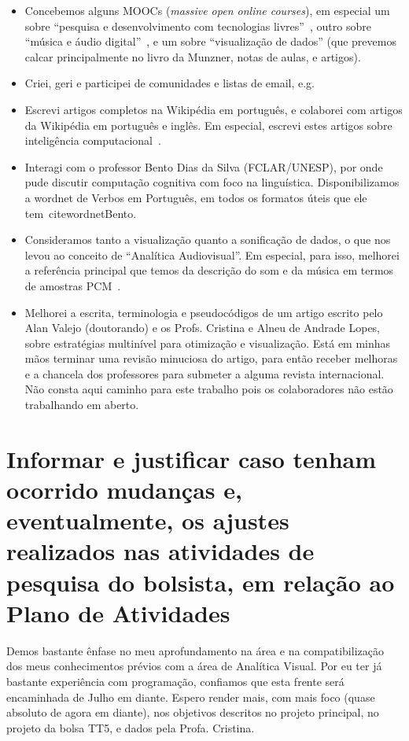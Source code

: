 \documentclass[a4paper, 11pt]{article}
\begin{document}
\begin{itemize}
  \item Concebemos alguns MOOCs (\emph{massive open online courses}), em especial um sobre ``pesquisa e desenvolvimento com tecnologias livres''~\cite{tecl}, outro sobre ``música e áudio digital''~\cite{mus}, e um sobre ``visualização de dados'' (que prevemos calcar principalmente no livro da Munzner, notas de aulas, e artigos).
  \item Criei, geri e participei de comunidades e listas de email, e.g.~\cite{vimUse,fvim,fpln,fic,frc}
  \item Escrevi artigos completos na Wikipédia em português, e colaborei com artigos da Wikipédia em português e inglês. Em especial, escrevi estes artigos sobre inteligência computacional~\cite{wic,wsd,wib,wpe,wpo,wed,wsi,wcc,wce}.
  \item Interagi com o professor Bento Dias da Silva (FCLAR/UNESP), por onde pude discutir computação cognitiva com foco na linguística. Disponibilizamos a wordnet de Verbos em Português, em todos os formatos úteis que ele tem~cite{wordnetBento}.
  \item Consideramos tanto a visualização quanto a sonificação de dados, o que nos levou ao conceito de ``Analítica Audiovisual''. Em especial, para isso, melhorei a referência principal que temos da descrição do som e da música em termos de amostras PCM~\cite{arxiv}.
  \item Melhorei a escrita, terminologia e pseudocódigos de um artigo escrito pelo Alan Valejo (doutorando) e os Profs. Cristina e Alneu de Andrade Lopes, sobre estratégias multinível para otimização e visualização. Está em minhas mãos terminar uma revisão minuciosa do artigo, para então receber melhoras e a chancela dos professores para submeter a alguma revista internacional. Não consta aqui caminho para este trabalho pois os colaboradores não estão trabalhando em aberto.
\end{itemize}

\section{Informar e justificar caso tenham ocorrido mudanças e, eventualmente, os ajustes realizados nas atividades de pesquisa do bolsista, em relação ao Plano de Atividades}
Demos bastante ênfase no meu aprofundamento na área e na compatibilização dos meus conhecimentos prévios com a área de Analítica Visual.
Por eu ter já bastante experiência com programação, confiamos que esta frente será encaminhada de Julho em diante.
Espero render mais, com mais foco (quase absoluto de agora em diante), nos objetivos descritos no projeto principal,
no projeto da bolsa TT5, e dados pela Profa. Cristina.
\end{document}
